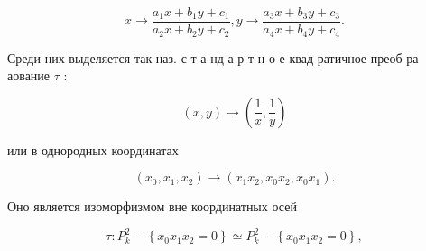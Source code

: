 \documentclass[10pt]{article}
\begin{document}
\[

x \longrightarrow \frac{a_{1} x+b_{1} y+c_{1}}{a_{2} x+b_{2} y+c_{2}}, y \longrightarrow \frac{a_{3} x+b_{3} y+c_{3}}{a_{4} x+b_{4} y+c_{4}} .

\]



Среди них выделяется так наз. с т а нд а р т н о е квад ратичное преоб ра аование $\tau$ :



\[

(x, y) \longrightarrow\left(\frac{1}{x}, \frac{1}{y}\right)

\]



или в однородных координатах



\[

\left(x_{0}, x_{1}, x_{2}\right) \rightarrow\left(x_{1} x_{2}, x_{0} x_{2}, x_{0} x_{1}\right) .

\]



Оно является изоморфизмом вне координатных осей



\[

\tau: P_{k}^{2}-\left\{x_{0} x_{1} x_{2}=0\right\} \simeq P_{k}^{2}-\left\{x_{0} x_{1} x_{2}=0\right\},

\]
\end{document}
